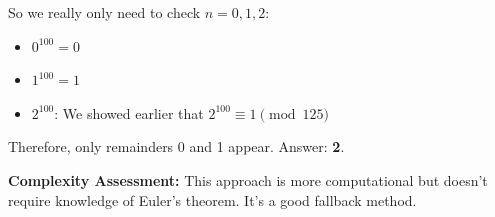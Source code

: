 \documentclass[12pt]{article}
\begin{document}
\begin{solutionbox}
So we really only need to check $n = 0, 1, 2$:
\begin{itemize}
    \item $0^{100} = 0$
    \item $1^{100} = 1$
    \item $2^{100}$: We showed earlier that $2^{100} \equiv 1 \pmod{125}$
\end{itemize}

Therefore, only remainders 0 and 1 appear. Answer: \textbf{2}.

\textbf{Complexity Assessment:} This approach is more computational but doesn't require knowledge of Euler's theorem. It's a good fallback method.
\end{solutionbox}

\vspace{1em}
\end{document}
